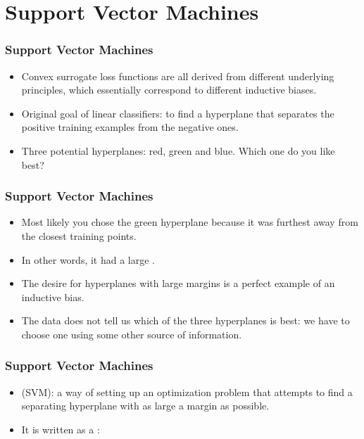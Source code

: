 \documentclass[trans,aspectratio=169]{beamer}
\begin{document}
\section{Support Vector Machines} \label{sec:loss:svm}

\begin{frame}
  \frametitle{Support Vector Machines}
\begin{itemize}
\item 
Convex
surrogate loss functions are all derived from different underlying principles,
which essentially correspond to different inductive biases.  
\item
Original goal of linear
classifiers: to find a hyperplane that separates the positive training
examples from the negative ones.
\item Three potential hyperplanes: red, green and blue.  Which
one do you like best?
\end{itemize}
\end{frame}


\begin{frame}
  \frametitle{Support Vector Machines}
\begin{itemize}
\item 
Most likely you chose the green hyperplane because it was furthest away from the closest training points. 
\item In
other words, it had a large . 
\item  The desire for
hyperplanes with large margins is a perfect example of an inductive
bias. 
\item  The data does not tell us which of the three hyperplanes is
best: we have to choose one using some other source of information.
\end{itemize}
\end{frame}


\begin{frame}
  \frametitle{Support Vector Machines}
\begin{itemize}
\item 
  (SVM): a way of setting up an
optimization problem that attempts to find a separating hyperplane
with as large a margin as possible. 
\item  It is written as a
:
%
%
\end{itemize}
\end{frame}
\end{document}

